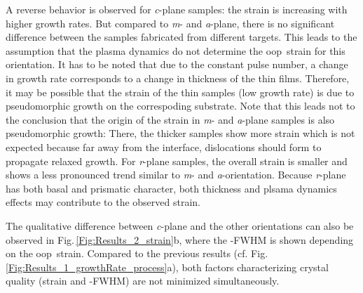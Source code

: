 A reverse behavior is observed for \textit{c}-plane samples: the strain is increasing with higher growth rates.
But compared to \textit{m}- and \textit{a}-plane, there is no significant difference between the samples fabricated from different targets.
This leads to the assumption that the plasma dynamics do not determine the \gls{oop}\ strain for this orientation.
It has to be noted that due to the constant pulse number, a change in growth rate corresponds to a change in thickness of the thin films.
Therefore, it may be possible that the strain of the thin samples (low growth rate) is due to pseudomorphic growth on the correspoding  substrate.
Note that this leads not to the conclusion that the origin of the strain in \textit{m}- and \textit{a}-plane samples is also pseudomorphic growth:
There, the thicker samples show more strain which is not expected because far away from the interface, dislocations should form to propagate relaxed growth.
For \textit{r}-plane samples, the overall strain is smaller and shows a less pronounced trend similar to \textit{m}- and \textit{a}-orientation.
Because \textit{r}-plane has both basal and prismatic character, both thickness and plsama dynamics effects may contribute to the observed strain.

The qualitative difference between \textit{c}-plane and the other orientations can also be observed in Fig.\,\ref{Fig:Results_2_strain}b, where the \textomega-FWHM is shown depending on the \gls{oop}\ strain.
Compared to the previous results (cf. Fig.\,\ref{Fig:Results_1_growthRate_process}a), both factors characterizing crystal quality (strain and \textomega-FWHM) are not minimized simultaneously.